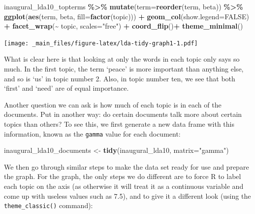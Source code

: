 \documentclass[
]{book}
\newenvironment{Shaded}{\begin{snugshade}}{\end{snugshade}}
\newcommand{\AttributeTok}[1]{\textcolor[rgb]{0.13,0.29,0.53}{#1}}
\newcommand{\ConstantTok}[1]{\textcolor[rgb]{0.56,0.35,0.01}{#1}}
\newcommand{\FunctionTok}[1]{\textcolor[rgb]{0.13,0.29,0.53}{\textbf{#1}}}
\newcommand{\NormalTok}[1]{#1}
\newcommand{\OtherTok}[1]{\textcolor[rgb]{0.56,0.35,0.01}{#1}}
\newcommand{\SpecialCharTok}[1]{\textcolor[rgb]{0.81,0.36,0.00}{\textbf{#1}}}
\newcommand{\StringTok}[1]{\textcolor[rgb]{0.31,0.60,0.02}{#1}}
\begin{document}
\begin{Shaded}
\begin{Highlighting}[]
\NormalTok{inaugural\_lda10\_topterms }\SpecialCharTok{\%\textgreater{}\%}
 \FunctionTok{mutate}\NormalTok{(}\AttributeTok{term=}\FunctionTok{reorder}\NormalTok{(term, beta)) }\SpecialCharTok{\%\textgreater{}\%}
 \FunctionTok{ggplot}\NormalTok{(}\FunctionTok{aes}\NormalTok{(term, beta, }\AttributeTok{fill=}\FunctionTok{factor}\NormalTok{(topic))) }\SpecialCharTok{+}
 \FunctionTok{geom\_col}\NormalTok{(}\AttributeTok{show.legend=}\ConstantTok{FALSE}\NormalTok{) }\SpecialCharTok{+}
 \FunctionTok{facet\_wrap}\NormalTok{(}\SpecialCharTok{\textasciitilde{}}\NormalTok{ topic, }\AttributeTok{scales=}\StringTok{"free"}\NormalTok{) }\SpecialCharTok{+}
 \FunctionTok{coord\_flip}\NormalTok{()}\SpecialCharTok{+}
 \FunctionTok{theme\_minimal}\NormalTok{()}
\end{Highlighting}
\end{Shaded}

\texttt{[image: \_main\_files/figure-latex/lda-tidy-graph1-1.pdf]}

What is clear here is that looking at only the words in each topic only says so much. In the first topic, the term `peace' is more important than anything else, and so is `us' in topic number 2. Also, in topic number ten, we see that both `first' and `need' are of equal importance.

Another question we can ask is how much of each topic is in each of the documents. Put in another way: do certain documents talk more about certain topics than others? To see this, we first generate a new data frame with this information, known as the \texttt{gamma} value for each document:

\begin{Shaded}
\begin{Highlighting}[]
\NormalTok{inaugural\_lda10\_documents }\OtherTok{\textless{}{-}} \FunctionTok{tidy}\NormalTok{(inaugural\_lda10, }\AttributeTok{matrix=}\StringTok{"gamma"}\NormalTok{)}
\end{Highlighting}
\end{Shaded}

We then go through similar steps to make the data set ready for use and prepare the graph. For the graph, the only steps we do different are to force R to label each topic on the axis (as otherwise it will treat it as a continuous variable and come up with useless values such as 7.5), and to give it a different look (using the \texttt{theme\_classic()} command):
\end{document}
